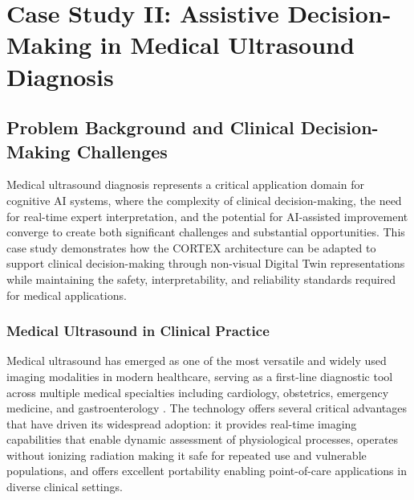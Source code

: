 
\chapter{Case Study II: Assistive Decision-Making in Medical Ultrasound Diagnosis} \label{chp:medical}


\section{Problem Background and Clinical Decision-Making Challenges}

Medical ultrasound diagnosis represents a critical application domain for cognitive AI systems, where the complexity of clinical decision-making, the need for real-time expert interpretation, and the potential for AI-assisted improvement converge to create both significant challenges and substantial opportunities. This case study demonstrates how the CORTEX architecture can be adapted to support clinical decision-making through non-visual Digital Twin representations while maintaining the safety, interpretability, and reliability standards required for medical applications.

\subsection{Medical Ultrasound in Clinical Practice}

Medical ultrasound has emerged as one of the most versatile and widely used imaging modalities in modern healthcare, serving as a first-line diagnostic tool across multiple medical specialties including cardiology, obstetrics, emergency medicine, and gastroenterology \cite{dietrich2017efsumb}. The technology offers several critical advantages that have driven its widespread adoption: it provides real-time imaging capabilities that enable dynamic assessment of physiological processes, operates without ionizing radiation making it safe for repeated use and vulnerable populations, and offers excellent portability enabling point-of-care applications in diverse clinical settings.

